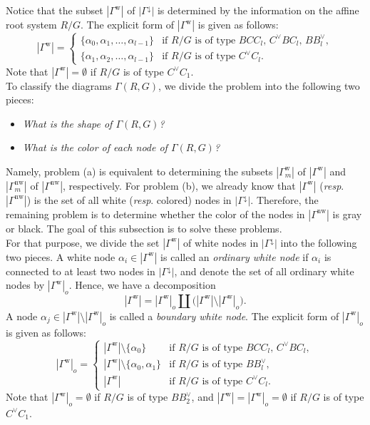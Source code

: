 \documentclass[11pt]{amsart}
\newcommand{\w}{\mathrm{w}}
\newcommand{\nw}{\mathrm{nw}}
\begin{document}
{Notice that the subset $|\Gamma^\w|$ of $|\Gamma^{\downarrow}|$ is determined by 
the information on the %
affine root system $R/G$.
The explicit form of $|\Gamma^\w|$ is given as follows:
\[|\Gamma^\w|=\begin{cases}
\{\alpha_0,\alpha_1,\ldots,\alpha_{l-1}\} & 
\text{if $R/G$ is of type $BCC_l,\, C^\vee BC_l,\, BB^\vee_l$},\\
\{\alpha_1,\alpha_2,\ldots,\alpha_{l-1}\} & 
\text{if $R/G$ is of type $C^\vee C_l$}.
\end{cases}\]
Note that $|\Gamma^\w|=\emptyset$ if $R/G$ is of type $C^\vee C_1$. \\

To classify the diagrams $\Gamma(R,G)$, 
we divide the problem into the following
two pieces: 
\vskip 1mm
\begin{itemize}
\item[(a)] {\it What is the shape of $\Gamma(R,G)$?}
\vskip 1mm
\item[(b)] {\it What is the color of each node of $\Gamma(R,G)$?}
\end{itemize}
\vskip 1mm
Namely,  problem (a) is equivalent to determining the subsets 
$|\Gamma_m^\w|$ of $|\Gamma^\w|$ and $|\Gamma^\nw_m|$ of 
$|\Gamma^\nw|$, respectively. For problem (b), we already know that
$|\Gamma^\w|
$ ({\it resp}. 
$|\Gamma^\nw|
$)
is the set of all white ({\it resp}. colored) nodes in $|\Gamma^\downarrow|$.
Therefore, the remaining problem is to determine whether the color of the nodes in  
$|\Gamma^\nw|$ is gray or black. 
The goal of this subsection is to solve these problems.\\

For that purpose, we divide the set $|\Gamma^\w|$ of white nodes in 
$|\Gamma^{\downarrow}|$ into the following two pieces.   
A white node $\alpha_i\in |\Gamma^\w|$ is called 
an {\it ordinary white node}  
if $\alpha_i$ is connected to at least two nodes in $|\Gamma^{\downarrow}|$, 
and denote the set of all ordinary white nodes by $|\Gamma^\w|_o$. 
\index[notations]{g820@$\vert\Gamma^\w\vert_o$}
Hence, we have a 
decomposition
\[|\Gamma^\w|=|\Gamma^\w|_o\amalg 
\big(|\Gamma^\w|\setminus |\Gamma^\w|_o\big).\]
A node $\alpha_j\in |\Gamma^\w|\setminus |\Gamma^\w|_o$ is called a {\it boundary
white node}. 
The explicit form of $|\Gamma^\w|_o$ is given as follows:
\[|\Gamma^\w|_o=\begin{cases}
|\Gamma^\w|\setminus \{\alpha_0\} & 
\text{if $R/G$ is of type $BCC_l,\, C^\vee BC_l$},\\
|\Gamma^\w|\setminus \{\alpha_0,\alpha_1\} & 
\text{if $R/G$ is of type $BB^\vee_l$},\\
|\Gamma^\w| & \text{if $R/G$ is of type $C^\vee C_l$}.
\end{cases}\]
Note that $|\Gamma^\w|_o=\emptyset$ if $R/G$ is of 
type $BB^\vee_2$, and $|\Gamma^\w|=|\Gamma^\w|_o=\emptyset$ 
if $R/G$ is of type $C^\vee C_1$. \\


}
\end{document}
